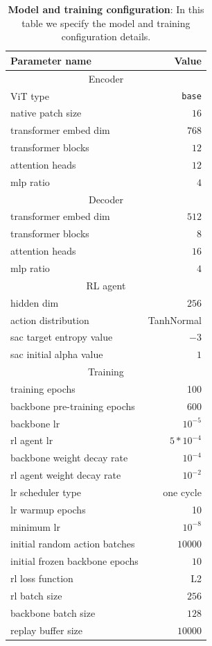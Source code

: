 \begin{table}[th]
\caption{\textbf{Model and training configuration}: In this table we specify the model and training configuration details.}
\vspace{-.2cm}
\label{tab:params}
\begin{center}
\begin{small}
\begin{tabular}{l@{\hskip2cm}r}
\toprule
Parameter name & Value \\
\midrule 
\multicolumn{2}{c}{Encoder} \\
\midrule 
ViT type & \texttt{base} \\
native patch size & $16$ \\
transformer embed dim & $768$ \\
transformer blocks & $12$ \\
attention heads & $12$ \\
mlp ratio & $4$ \\
\midrule 
\multicolumn{2}{c}{Decoder} \\
\midrule 
transformer embed dim & $512$ \\
transformer blocks & $8$ \\
attention heads & $16$ \\
mlp ratio & $4$ \\

\midrule 
\multicolumn{2}{c}{RL agent} \\
\midrule 
hidden dim & $256$ \\
action distribution & TanhNormal \\
sac target entropy value & $-3$ \\
sac initial alpha value & $1$ \\
\midrule 
\multicolumn{2}{c}{Training} \\
\midrule 
training epochs & 100 \\
backbone pre-training epochs & 600 \\
backbone lr & $10^{-5}$ \\
rl agent lr & $5 * 10^{-4}$ \\
backbone weight decay rate & $10^{-4}$ \\
rl agent weight decay rate & $10^{-2}$ \\
lr scheduler type & one cycle \\
lr warmup epochs & 10 \\
minimum lr & $10^{-8}$\\
initial random action batches & $10000$ \\
initial frozen backbone epochs & $10$ \\
rl loss function & L2 \\
rl batch size & $256$ \\
backbone batch size & $128$ \\
replay buffer size & $10000$ \\

\bottomrule
\end{tabular}
\end{small}
\end{center}
\end{table}

